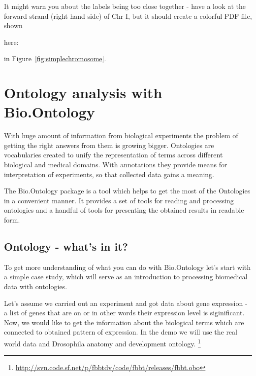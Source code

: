 \documentclass{report}
\begin{document}
It might warn you about the labels being too close together - have a look
at the forward strand (right hand side) of Chr I, but it should create a
colorful PDF file, shown
\begin{htmlonly}
here:


\end{htmlonly}
\begin{latexonly}
in Figure~\ref{fig:simplechromosome}.
\end{latexonly}


\chapter{Ontology analysis with Bio.Ontology}

\label{sec:Ontology}

With huge amount of information from biological experiments the problem of
getting the right answers from them is growing bigger. Ontologies are
vocabularies created to unify the representation of terms across different
biological and medical domains. With annotations they provide means for
interpretation of experiments, so that collected data gains a meaning.

The Bio.Ontology package is a tool which helps to get the most of the
Ontologies in a convenient manner. It provides a set of tools for reading
and processing ontologies and a handful of tools for presenting the obtained
results in readable form.

\section{Ontology - what's in it?}
\label{sec:demo}

To get more understanding of what you can do with Bio.Ontology let's start with
a simple case study, which will serve as an introduction to processing
biomedical data with ontologies. 

Let's assume we carried out an experiment and got data about gene expression -
a list of genes that are on or in other words their expression level is
siginificant. Now, we would like to get the
information about the biological terms which are connected to obtained pattern
of expression. In the demo we will use the real world data and Drosophila anatomy and development ontology.
\footnote{\url{http://svn.code.sf.net/p/fbbtdv/code/fbbt/releases/fbbt.obo}}
\end{document}
